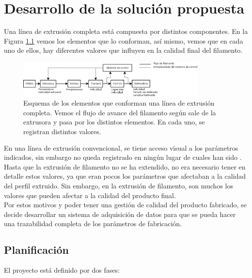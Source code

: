 \chapter{Desarrollo de la solución propuesta}
\label{cap:descrip}

Una línea de extrusión completa está compuesta por distintos componentes. En la Figura \ref{fig:esquema_extrusora} vemos los elementos que lo conforman, así mismo, vemos que en cada uno de ellos, hay diferentes valores que influyen en la calidad final del filamento.\\

\begin{figure}[H]
    \centering
    \includegraphics[width=0.85\textwidth]{images/esquema_extrusion.png}
    \caption[Esquema de los elementos que conforman una extrusora.]{Esquema de los elementos que conforman una línea de extrusión completa. Vemos el flujo de avance del filamento según sale de la extrusora y pasa por los distintos elementos. En cada uno, se registran distintos valores.}
    \label{fig:esquema_extrusora}
\end{figure}

En una línea de extrusión convencional, se tiene acceso visual a los parámetros indicados, sin embargo no queda registrado en ningún lugar de cuales han sido . Hasta que la extrusión de filamento no se ha extendido, no era necesario tener en detalle estos valores, ya que eran pocos los parámetros que afectaban a la calidad del perfil extruido. Sin embargo, en la extrusión de filamento, son muchos los valores que pueden afectar a la calidad del producto final.\\

Por estos motivos y poder tener una gestión de calidad del producto fabricado, se decide desarrollar un sistema de adquisición de datos para que se pueda hacer una trazabilidad completa de los parámetros de fabricación.\\

\section{Planificación}
\label{sec:planificacion}

El proyecto está definido por dos fases:\\

